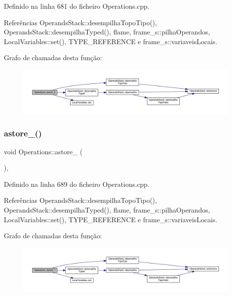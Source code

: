 Definido na linha 681 do ficheiro Operations.\+cpp.



Referências Operands\+Stack\+::desempilha\+Topo\+Tipo(), Operands\+Stack\+::desempilha\+Typed(), flame, frame\+\_\+s\+::pilha\+Operandos, Local\+Variables\+::set(), T\+Y\+P\+E\+\_\+\+R\+E\+F\+E\+R\+E\+N\+CE e frame\+\_\+s\+::variaveis\+Locais.

Grafo de chamadas desta função\+:
\nopagebreak
\begin{figure}[H]
\begin{center}
\leavevmode
\includegraphics[width=350pt]{classOperations_a140f2e8501424f8a73dbfecfa3ca859f_cgraph}
\end{center}
\end{figure}
\mbox{\label{classOperations_a1a7a41be018313dd524df5327c8b6035}} 
\subsubsection{\texorpdfstring{astore\+\_()}{astore\_1()}}
{\footnotesize\ttfamily void Operations\+::astore\+\_ (\begin{DoxyParamCaption}{ }\end{DoxyParamCaption})\hspace{0.3cm}{\ttfamily [static]}, {\ttfamily [private]}}



Definido na linha 689 do ficheiro Operations.\+cpp.



Referências Operands\+Stack\+::desempilha\+Topo\+Tipo(), Operands\+Stack\+::desempilha\+Typed(), flame, frame\+\_\+s\+::pilha\+Operandos, Local\+Variables\+::set(), T\+Y\+P\+E\+\_\+\+R\+E\+F\+E\+R\+E\+N\+CE e frame\+\_\+s\+::variaveis\+Locais.

Grafo de chamadas desta função\+:
\nopagebreak
\begin{figure}[H]
\begin{center}
\leavevmode
\includegraphics[width=350pt]{classOperations_a1a7a41be018313dd524df5327c8b6035_cgraph}
\end{center}
\end{figure}
\mbox{\label{classOperations_a01e238bbea0f9d61d80a8fcd3ed2f660}} 
